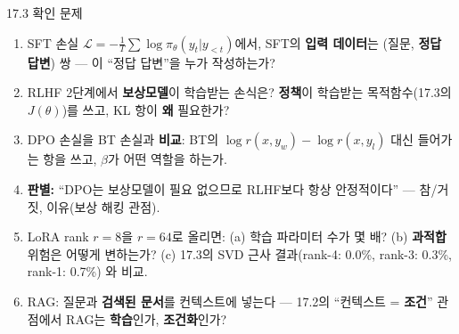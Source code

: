 \documentclass[aspectratio=169,11pt]{beamer}
\begin{document}
\begin{frame}{17.3 확인 문제}
  \small
  \begin{enumerate}
    \item SFT 손실 $\mathcal{L} = -\frac{1}{T}\sum
      \log \pi_\theta(y_t | y_{<t})$에서, SFT의 \textbf{입력
      데이터}는 (질문, \textbf{정답 답변}) 쌍 — 이 ``정답
      답변''을 누가 작성하는가?
    \item RLHF 2단계에서 \textbf{보상모델}이 학습받는
      손식은? \textbf{정책}이 학습받는 목적함수(17.3의
      $J(\theta)$)를 쓰고, KL 항이 \textbf{왜} 필요한가?
    \item DPO 손실을 BT 손실과 \textbf{비교}: BT의
      $\log r(x, y_w) - \log r(x, y_l)$ 대신 들어가는
      항을 쓰고, $\beta$가 어떤 역할을 하는가.
    \item \textbf{판별:} ``DPO는 보상모델이 필요 없으므로
      RLHF보다 항상 안정적이다'' — 참/거짓, 이유(보상 해킹
      관점).
    \item LoRA rank $r = 8$을 $r = 64$로 올리면:
      (a) 학습 파라미터 수가 몇 배? (b) \textbf{과적합}
      위험은 어떻게 변하는가? (c) 17.3의 SVD 근사
      결과(rank-4: 0.0\%, rank-3: 0.3\%, rank-1: 0.7\%)
      와 비교.
    \item RAG: 질문과 \textbf{검색된 문서}를 컨텍스트에
      넣는다 — 17.2의 ``컨텍스트 = \textbf{조건}'' 관점에서
      RAG는 \textbf{학습}인가, \textbf{조건화}인가?
  \end{enumerate}
\end{frame}
\end{document}
